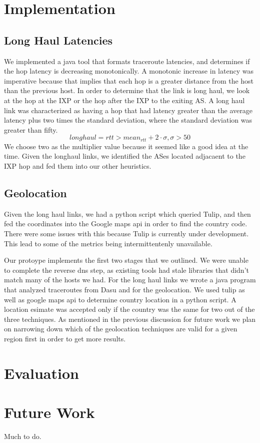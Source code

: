 \documentclass{acm_proc_article-sp}
\begin{document}
\section{Implementation}
\subsection{Long Haul Latencies}
We implemented a java tool that formats traceroute latencies, and determines if the hop latency is decreasing monotonically.
A monotonic increase in latency was imperative because that implies that each hop is a greater distance from the host than the previous host.
In order to determine that the link is long haul, we look at the hop at the IXP or the hop after the IXP to the exiting AS.
A long haul link was characterized as having a hop that had latency greater than the average latency plus two times the standard deviation, where the 
standard deviation was greater than fifty.
$$ longhaul = rtt > mean_{rtt} + 2\cdot \sigma, \sigma > 50$$
We choose two as the multiplier value because it seemed like a good idea at the time. Given the longhaul links, we identified the ASes located adjacaent to the IXP hop and fed them into our 
other heuristics.
\subsection{Geolocation}
Given the long haul links, we had a python script which queried Tulip, and then fed the coordinates into the Google maps api in order to find the country code.
There were some issues with this because Tulip is currently under development. This lead to some of the metrics being intermittentenly unavailable.

Our protoype implements the first two stages that we outlined. We were unable to complete the reverse dns step, as existing tools 
had stale libraries that didn't match many of the hosts we had. For the long haul links we wrote a java program that analyzed traceroutes
from Dasu and for the geolocation. We used tulip as well as google maps api to determine country location in a python script.
A location esimate was accepted only if the country was the same for two out of the three techniques.
 As mentioned in the previous discussion for future work we plan on 
narrowing down which of the geolocation techniques are valid for a given region first in order to get more results.

\section{Evaluation}
\label{sec:approach}

\section{Future Work}
\label{sec:future}
Much to do.



\end{document}
